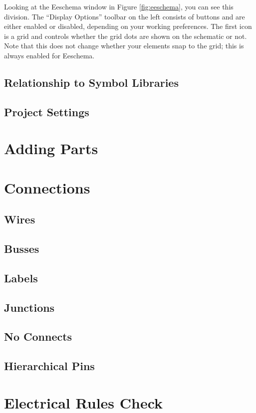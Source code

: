 Looking at the Eeschema window in Figure \ref{fig:eeschema}, you can see this division.
The ``Display Options'' toolbar on the left consists of buttons and are either enabled or disabled, depending on your working preferences.
The first icon is a grid and controls whether the grid dots are shown on the schematic or not.
Note that this does not change whether your elements snap to the grid; this is always enabled for Eeschema.




\subsection{Relationship to Symbol Libraries}
\subsection{Project Settings}

\section{Adding Parts}

\section{Connections}
\subsection{Wires}
\subsection{Busses}
\subsection{Labels}
\subsection{Junctions}
\subsection{No Connects}
\subsection{Hierarchical Pins}

\section{Electrical Rules Check}

